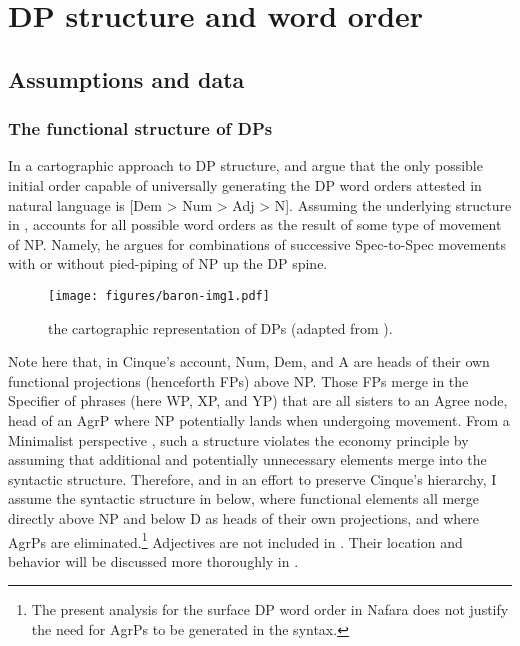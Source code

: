 \documentclass[output=paper]{langscibook}
\begin{document}
\section{DP structure and word order} 
\subsection{Assumptions and data}
\label{sec:baron:2.1}
\subsubsection{The functional structure of DPs}
\label{sec:baron:2.1.1}
In a cartographic approach to DP structure, \citet{Greenberg1963} and \citet{Cinque2005} argue that the only possible initial order capable of universally generating the DP word orders attested in natural language is [Dem > Num > Adj > N]. Assuming the underlying structure in , \citeauthor{Cinque2005} accounts for all possible word orders as the result of some type of movement of NP. Namely, he argues for combinations of successive Spec-to-Spec movements with or without pied-piping of NP up the DP spine. 

  
\begin{figure} 
\texttt{[image: figures/baron-img1.pdf]} %
\caption{the cartographic representation of DPs (adapted from \citealt[2]{Cinque2005}).} 
\label{fig:baron:1}
\end{figure}

Note here that, in Cinque’s account, Num, Dem, and A are heads of their own functional projections (henceforth FPs) above NP. Those FPs merge in the Specifier of phrases (here WP, XP, and YP) that are all sisters to an Agree node, head of an AgrP where NP potentially lands when undergoing movement. From a Minimalist perspective \citep{Chomsky1995}, such a structure violates the economy principle by assuming that additional and potentially unnecessary elements merge into the syntactic structure. Therefore, and in an effort to preserve Cinque’s hierarchy, I assume the syntactic structure in  below, where functional elements all merge directly above NP and below D as heads of their own projections, and where AgrPs are eliminated.\footnote{The present analysis for the surface DP word order in Nafara does not justify the need for AgrPs to be generated in the syntax.} Adjectives are not included in . Their location and behavior will be discussed more thoroughly in .
\end{document}
